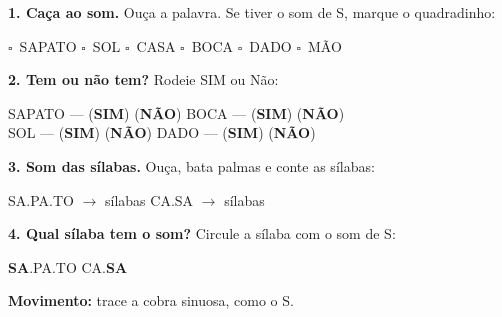 \begin{somletra}
\textbf{1. Ca\c{c}a ao som.} Ou\c{c}a a palavra. Se tiver o som de S, marque o quadradinho:
\begin{center}
$\square$~SAPATO \quad $\square$~SOL \quad $\square$~CASA \quad $\square$~BOCA \quad $\square$~DADO \quad $\square$~M\~AO
\end{center}

\textbf{2. Tem ou n\~ao{} tem?} Rodeie SIM ou N\~ao:
\begin{center}
SAPATO --- (\textbf{SIM}) (\textbf{N\~AO}) \quad BOCA --- (\textbf{SIM}) (\textbf{N\~AO}) \\ SOL --- (\textbf{SIM}) (\textbf{N\~AO}) \quad DADO --- (\textbf{SIM}) (\textbf{N\~AO})
\end{center}
\end{somletra}

\begin{somsilaba}
\textbf{3. Som das s\'ilabas.} Ou\c{c}a, bata palmas e conte as s\'ilabas:
\begin{center}
SA.PA.TO $\rightarrow$ \underline{\hspace{1cm}} s\'ilabas \quad CA.SA $\rightarrow$ \underline{\hspace{1cm}} s\'ilabas
\end{center}

\textbf{4. Qual s\'ilaba tem o som?} Circule a s\'ilaba com o som de S:
\begin{center}
\textbf{SA}.PA.TO \quad CA.\textbf{SA}
\end{center}
\end{somsilaba}



\begin{motricidade}
\textbf{Movimento:} trace a cobra sinuosa, como o S.
\begin{center}
\end{center}
\end{motricidade}

